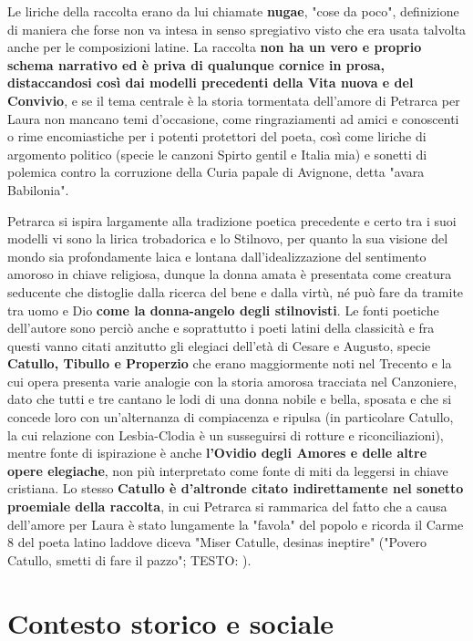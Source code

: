 \documentclass[10pt,a4paper]{article}
\begin{document}
Le liriche della raccolta erano da lui chiamate \textbf{nugae}, "cose da poco", definizione di maniera che forse non va intesa in senso spregiativo visto che era usata talvolta anche per le composizioni latine. La raccolta \textbf{non ha un vero e proprio schema narrativo ed è priva di qualunque cornice in prosa, distaccandosi così dai modelli precedenti della Vita nuova e del Convivio}, e se il tema centrale è la storia tormentata dell'amore di Petrarca per Laura non mancano temi d'occasione, come ringraziamenti ad amici e conoscenti o rime encomiastiche per i potenti protettori del poeta, così come liriche di argomento politico (specie le canzoni Spirto gentil e Italia mia) e sonetti di polemica contro la corruzione della Curia papale di Avignone, detta "avara Babilonia".

Petrarca si ispira largamente alla tradizione poetica precedente e certo tra i suoi modelli vi sono la lirica trobadorica e lo Stilnovo, per quanto la sua visione del mondo sia profondamente laica e lontana dall'idealizzazione del sentimento amoroso in chiave religiosa, dunque la donna amata è presentata come creatura seducente che distoglie dalla ricerca del bene e dalla virtù, né può fare da tramite tra uomo e Dio \textbf{come la donna-angelo degli stilnovisti}. Le fonti poetiche dell'autore sono perciò anche e soprattutto i poeti latini della classicità e fra questi vanno citati anzitutto gli elegiaci dell'età di Cesare e Augusto, specie \textbf{Catullo, Tibullo e Properzio} che erano maggiormente noti nel Trecento e la cui opera presenta varie analogie con la storia amorosa tracciata nel Canzoniere, dato che tutti e tre cantano le lodi di una donna nobile e bella, sposata e che si concede loro con un'alternanza di compiacenza e ripulsa (in particolare Catullo, la cui relazione con Lesbia-Clodia è un susseguirsi di rotture e riconciliazioni), mentre fonte di ispirazione è anche \textbf{l'Ovidio degli Amores e delle altre opere elegiache}, non più interpretato come fonte di miti da leggersi in chiave cristiana. Lo stesso \textbf{Catullo è d'altronde citato indirettamente nel sonetto proemiale della raccolta}, in cui Petrarca si rammarica del fatto che a causa dell'amore per Laura è stato lungamente la "favola" del popolo e ricorda il Carme 8 del poeta latino laddove diceva "Miser Catulle, desinas ineptire" ("Povero Catullo, smetti di fare il pazzo"; TESTO: ).

\section{Contesto storico e sociale}
\end{document}
